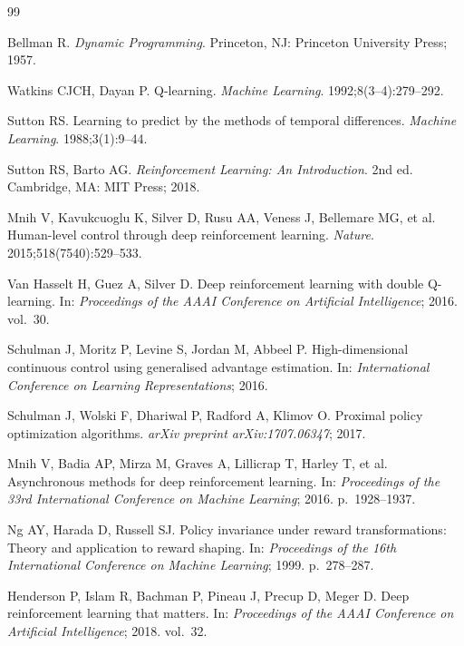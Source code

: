 \documentclass[a4paper,12pt]{article}
\begin{document}
\newpage
\begin{thebibliography}{99}

Bellman R.
\textit{Dynamic Programming}.
Princeton, NJ: Princeton University Press; 1957.

Watkins CJCH, Dayan P.
Q-learning.
\textit{Machine Learning}. 1992;8(3--4):279--292.

Sutton RS.
Learning to predict by the methods of temporal differences.
\textit{Machine Learning}. 1988;3(1):9--44.

Sutton RS, Barto AG.
\textit{Reinforcement Learning: An Introduction}. 2nd ed.
Cambridge, MA: MIT Press; 2018.

Mnih V, Kavukcuoglu K, Silver D, Rusu AA, Veness J, Bellemare MG, et al.
Human-level control through deep reinforcement learning.
\textit{Nature}. 2015;518(7540):529--533.

Van Hasselt H, Guez A, Silver D.
Deep reinforcement learning with double Q-learning.
In: \textit{Proceedings of the AAAI Conference on Artificial Intelligence}; 2016. vol.~30.

Schulman J, Moritz P, Levine S, Jordan M, Abbeel P.
High-dimensional continuous control using generalised advantage estimation.
In: \textit{International Conference on Learning Representations}; 2016.

Schulman J, Wolski F, Dhariwal P, Radford A, Klimov O.
Proximal policy optimization algorithms.
\textit{arXiv preprint arXiv:1707.06347}; 2017.

Mnih V, Badia AP, Mirza M, Graves A, Lillicrap T, Harley T, et al.
Asynchronous methods for deep reinforcement learning.
In: \textit{Proceedings of the 33rd International Conference on Machine Learning}; 2016. p.~1928--1937.

Ng AY, Harada D, Russell SJ.
Policy invariance under reward transformations: Theory and application to reward shaping.
In: \textit{Proceedings of the 16th International Conference on Machine Learning}; 1999. p.~278--287.

Henderson P, Islam R, Bachman P, Pineau J, Precup D, Meger D.
Deep reinforcement learning that matters.
In: \textit{Proceedings of the AAAI Conference on Artificial Intelligence}; 2018. vol.~32.


\end{thebibliography}
\end{document}

